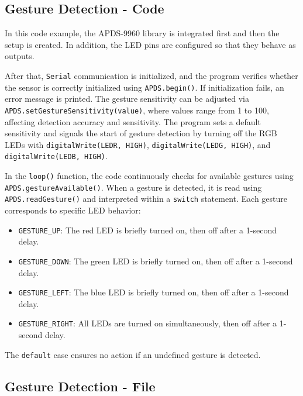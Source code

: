 \subsection{Gesture Detection - Code}

In this code example, the APDS-9960 library is integrated first and then the setup is created.
In addition, the LED pins are configured so that they behave as outputs.



 After that, \texttt{Serial} communication is initialized, and the program verifies whether the sensor is correctly initialized using \texttt{APDS.begin()}. If initialization fails, an error message is printed. The gesture sensitivity can be adjusted via \texttt{APDS.setGestureSensitivity(value)}, where values range from 1 to 100, affecting detection accuracy and sensitivity. The program sets a default sensitivity and signals the start of gesture detection by turning off the RGB LEDs with \texttt{digitalWrite(LEDR, HIGH)}, \texttt{digitalWrite(LEDG, HIGH)}, and \texttt{digitalWrite(LEDB, HIGH)}.

In the \texttt{loop()} function, the code continuously checks for available gestures using \texttt{APDS.gestureAvailable()}. When a gesture is detected, it is read using \texttt{APDS.readGesture()} and interpreted within a \texttt{switch} statement. Each gesture corresponds to specific LED behavior:

\begin{itemize}
	\item \texttt{GESTURE\_UP}: The red LED is briefly turned on, then off after a 1-second delay.
	\item \texttt{GESTURE\_DOWN}: The green LED is briefly turned on, then off after a 1-second delay.
	\item \texttt{GESTURE\_LEFT}: The blue LED is briefly turned on, then off after a 1-second delay.
	\item \texttt{GESTURE\_RIGHT}: All LEDs are turned on simultaneously, then off after a 1-second delay.
\end{itemize}

The \texttt{default} case ensures no action if an undefined gesture is detected.




\subsection{Gesture Detection - File}

